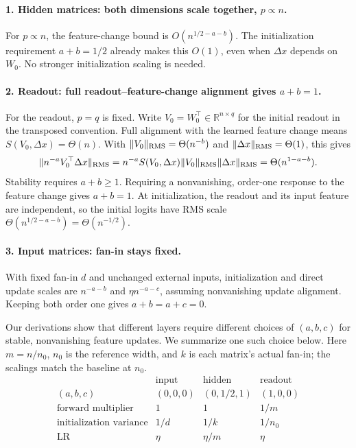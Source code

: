 \paragraph{1. Hidden matrices: both dimensions scale together, $p\propto n$.}
For $p\propto n$, the feature-change bound is $O(n^{1/2-a-b})$.
The initialization requirement $a+b=1/2$ already makes this $O(1)$, even when
$\Delta x$ depends on $W_0$. No stronger initialization scaling is needed.

\paragraph{2. Readout: full readout--feature-change alignment gives $a+b=1$.}
For the readout, $p=q$ is fixed. Write $V_0=W_0^\top\in\mathbb R^{n\times q}$
for the initial readout in the transposed convention. Full alignment with
the learned feature change means $S(V_0,\Delta x)=\Theta(n)$.
With $\|V_0\|_{\rm RMS}=\Theta(n^{-b})$ and
$\|\Delta x\|_{\rm RMS}=\Theta(1)$, this gives
\[
 \|n^{-a}V_0^\top\Delta x\|_{\rm RMS}
 =n^{-a}S(V_0,\Delta x)\|V_0\|_{\rm RMS}\|\Delta x\|_{\rm RMS}
 =\Theta(n^{1-a-b}).
\]
Stability requires $a+b\ge1$. Requiring a nonvanishing, order-one response
to the feature change gives $a+b=1$.
At initialization, the readout and its input feature are independent, so the
initial logits have RMS scale $\Theta(n^{1/2-a-b})=\Theta(n^{-1/2})$.

\paragraph{3. Input matrices: fan-in stays fixed.}
With fixed fan-in $d$ and unchanged external inputs, initialization and direct
update scales are $n^{-a-b}$ and $\eta n^{-a-c}$, assuming nonvanishing update
alignment. Keeping both order one gives $a+b=a+c=0$.

Our derivations show that different layers require different choices of
$(a,b,c)$ for stable, nonvanishing feature updates. We summarize one such
choice below. Here $m=n/n_0$, $n_0$ is the reference width, and $k$ is each
matrix's actual fan-in; the scalings match the baseline at $n_0$.
\[
 \begin{array}{c|ccc}
 &\text{input}&\text{hidden}&\text{readout}\\\hline
 (a,b,c)&(0,0,0)&(0,1/2,1)&(1,0,0)\\
 \text{forward multiplier}&1&1&1/m\\
 \text{initialization variance}&1/d&1/k&1/n_0\\
 \text{LR}&\eta&\eta/m&\eta
 \end{array}
\]
\begingroup
\setcounter{question}{-1}
\renewcommand{\aTwoProblemNumber}{4.\arabic{question}}



\endgroup
\setcounter{question}{4}


